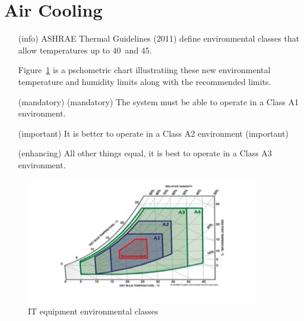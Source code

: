 \section{Air Cooling}
\begin{itemize}
\item[(info)]
ASHRAE Thermal Guidelines (2011) define environmental classes that allow temperatures up to 40\celsius~and
45\celsius.  

Figure~\ref{fig:ITenviron} is a pschometric chart illustratiing these new environmental temperature and humidity limits along with the recommended limits.

\item[(mandatory)]
(mandatory)	The system must be able to operate in a Class A1 environment.  

\item[(important)]
It is better to operate in a Class A2 environment (important) 

\item[(enhancing)]
All other things equal, it is best to operate in a Class A3 environment.
\end{itemize}

\begin{figure}
\centering
\includegraphics[width=4in]{fig2}
\caption{IT equipment environmental classes}
\label{fig:ITenviron}
\end{figure}

